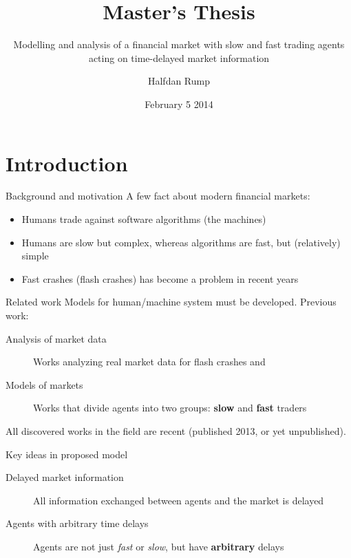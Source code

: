 \documentclass[14pt]{beamer}
\subtitle{Modelling and analysis of a financial market with slow and fast trading agents acting on time-delayed market information}
\title{Master's Thesis}
\author{Halfdan Rump}
\date{February 5 2014} %
\institute{Waseda GRS-FSE} %
\begin{document}
\begin{frame}
  \titlepage
\end{frame}





\section{Introduction}
\begin{frame}
\tableofcontents[currentsection]
\end{frame}

\begin{frame}{Background and motivation}
A few fact about modern financial markets:
\begin{itemize}
	\item Humans trade against software algorithms (the machines) 
	\item Humans are slow but complex, whereas algorithms are fast, but (relatively) simple
	\item Fast crashes (flash crashes) has become a problem in recent years
\end{itemize}
\end{frame}

\begin{frame}{Related work}
Models for human/machine system must be developed. Previous work:
\begin{description}
	\item[Analysis of market data] Works analyzing real market data for flash crashes and
	\item[Models of markets] Works that divide agents into two groups: \textbf{slow} and \textbf{fast} traders
\end{description}
All discovered works in the field are recent (published 2013, or yet unpublished).
\end{frame}

\begin{frame}{Key ideas in proposed model}
\begin{description}
\item[Delayed market information] All information exchanged between agents and the market is delayed
\item[Agents with arbitrary time delays] Agents are not just \textit{fast} or \textit{slow}, but have \textbf{arbitrary} delays
\end{description}
\end{frame}
\end{document}
